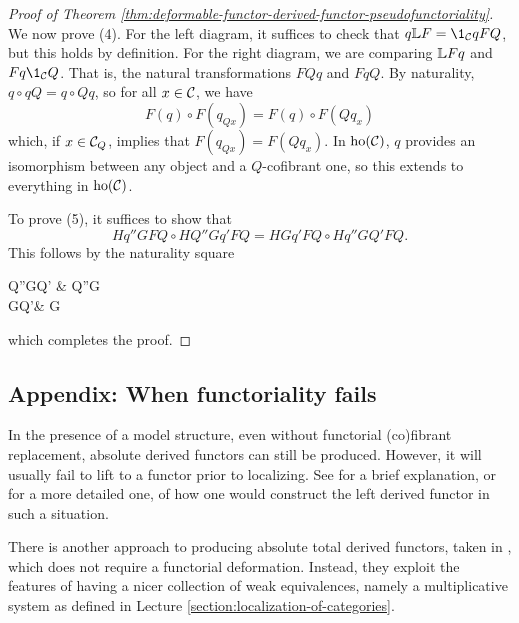 \begin{proof}[Proof of Theorem \ref{thm:deformable-functor-derived-functor-pseudofunctoriality}]
We now prove (4). For the left diagram, it suffices to check that \( q \bbL F = \1_\calC q FQ \), but this holds by definition. For the right diagram, we are comparing
\(\mathbb{L} Fq\) and \(Fq\1_\calC Q\). That is, the natural transformations \(FQq\) and \(FqQ\). By naturality, \(q\circ qQ = q\circ Qq\), so for all \(x\in\mathcal{C}\), we have
\[ F(q)\circ F(q_{Qx}) = F(q)\circ F(Qq_x) \]
which, if \(x\in\mathcal{C}_Q\), implies that \(F(q_{Qx}) = F(Qq_x)\). In \(\operatorname{ho}(\mathcal{C})\), \(q\) provides an isomorphism between any object and a \(Q\)-cofibrant one, so this extends to everything in \(\operatorname{ho}(\mathcal{C})\).

To prove (5), it suffices to show that
\[ Hq''GFQ \circ HQ'' Gq'FQ = HGq'FQ\circ Hq''GQ'FQ. \]
This follows by the naturality square
\begin{diagram*}
	Q''GQ' \ar[r,Rightarrow,"Q''Gq'"]\ar[d,Rightarrow,"q''GQ'"'] & Q''G \ar[d,Rightarrow,"q''G"] \\
	GQ'\ar[r,Rightarrow,"Gq'"'] & G
\end{diagram*}
which completes the proof.
\end{proof}


\subsection{Appendix: When functoriality fails}

\begin{remark}
	In the presence of a model structure, even without functorial (co)fibrant replacement, absolute derived functors can still be produced. However, it will usually fail to lift to a functor prior to localizing.
	See \cite{426439} for a brief explanation, or \cite{cisinski-book} for a more detailed one, of how one would construct the left derived functor in such a situation.
\end{remark}

There is another approach to producing absolute total derived functors, taken in \cite{kashiwara-schapira-book}, which does not require a functorial deformation.
Instead, they exploit the features of having a nicer collection of weak equivalences, namely a multiplicative system as defined in Lecture \ref{section:localization-of-categories}.


